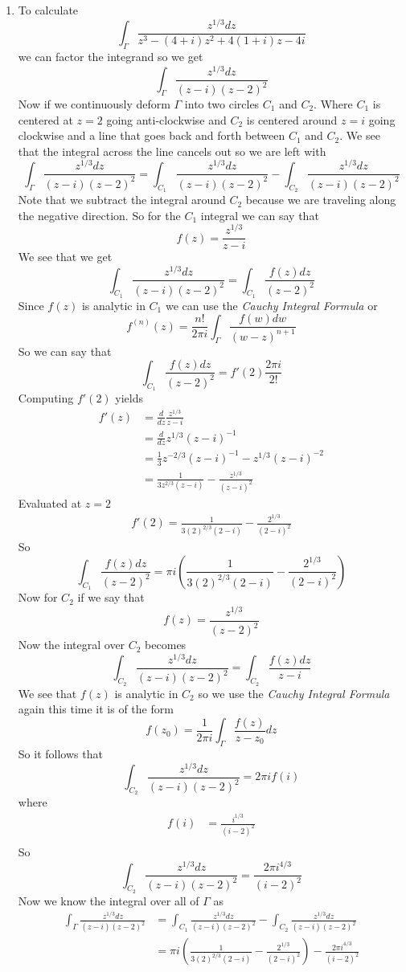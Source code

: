 \documentclass[11pt]{article}
\begin{document}
\begin{enumerate}
\begin{enumerate}
\item  
To calculate 
$$\int_{\Gamma}\frac{z^{1/3}dz}{z^3-(4+i)z^2+4(1+i)z-4i}$$
we can factor the integrand so we get
$$\int_{\Gamma}\frac{z^{1/3}dz}{(z-i)(z-2)^2}$$
Now if we continuously deform $\Gamma$ into two circles $C_1$ and $C_2$. Where $C_1$ is centered at $z=2$ going anti-clockwise and $C_2$ is centered around $z=i$ going clockwise and a line that goes back and forth between $C_1$ and $C_2$. We see that the integral across the line cancels out so we are left with
$$\int_{\Gamma}\frac{z^{1/3}dz}{(z-i)(z-2)^2} = \int_{C_1}\frac{z^{1/3}dz}{(z-i)(z-2)^2} - \int_{C_2}\frac{z^{1/3}dz}{(z-i)(z-2)^2}$$
Note that we subtract the integral around $C_2$ because we are traveling along the negative direction. So for the $C_1$ integral we can say that 
$$f(z) = \frac{z^{1/3}}{z-i}$$
We see that we get
$$\int_{C_1}\frac{z^{1/3}dz}{(z-i)(z-2)^2} = \int_{C_1}\frac{f(z)dz}{(z-2)^2}$$ 
Since $f(z)$ is analytic in $C_1$ we can use the \emph{Cauchy Integral Formula} or
$$f^{(n)}(z) = \frac{n!}{2\pi i}\int_{\Gamma}\frac{f(w)dw}{(w-z)^{n+1}}$$
So we can say that
$$\int_{C_1}\frac{f(z)dz}{(z-2)^2} = f'(2)\frac{2\pi i}{2!}$$
Computing $f'(2)$ yields
\begin{align*}
f'(z) &= \frac{d}{dz}\frac{z^{1/3}}{z-i}\\
&= \frac{d}{dz}z^{1/3}(z-i)^{-1}\\
&= \frac{1}{3}z^{-2/3}(z-i)^{-1} - z^{1/3}(z-i)^{-2}\\
&= \frac{1}{3z^{2/3}(z-i)} - \frac{z^{1/3}}{(z-i)^{2}}
\end{align*}
Evaluated at $z=2$ 
\begin{align*}
f'(2) = \frac{1}{3(2)^{2/3}(2-i)} - \frac{2^{1/3}}{(2-i)^{2}}
\end{align*}
So 
$$\int_{C_1}\frac{f(z)dz}{(z-2)^2} = \pi i\left(\frac{1}{3(2)^{2/3}(2-i)} - \frac{2^{1/3}}{(2-i)^{2}}\right)$$
Now for $C_2$ if we say that 
$$f(z) = \frac{z^{1/3}}{(z-2)^2}$$
Now the integral over $C_2$ becomes 
$$\int_{C_2}\frac{z^{1/3}dz}{(z-i)(z-2)^2} = \int_{C_2}\frac{f(z)dz}{z-i} $$
We see that $f(z)$ is analytic in $C_2$ so we use the \emph{Cauchy Integral Formula} again this time it is of the form
$$f(z_0) = \frac{1}{2\pi i}\int_{\Gamma}\frac{f(z)}{z-z_0}dz$$
So it follows that
$$\int_{C_2}\frac{z^{1/3}dz}{(z-i)(z-2)^2} = 2\pi if(i)$$
where
\begin{align*}
f(i) &= \frac{i^{1/3}}{(i-2)^2}\\
\end{align*}
So 
$$\int_{C_2}\frac{z^{1/3}dz}{(z-i)(z-2)^2} = \frac{2\pi i^{4/3}}{(i-2)^2}$$
Now we know the integral over all of $\Gamma$ as
\begin{align*}
\int_{\Gamma}\frac{z^{1/3}dz}{(z-i)(z-2)^2} &= \int_{C_1}\frac{z^{1/3}dz}{(z-i)(z-2)^2} - \int_{C_2}\frac{z^{1/3}dz}{(z-i)(z-2)^2}\\
&= \pi i\left(\frac{1}{3(2)^{2/3}(2-i)} - \frac{2^{1/3}}{(2-i)^{2}}\right)- \frac{2\pi i^{4/3}}{(i-2)^2}
\end{align*}


\end{enumerate}
\end{enumerate}
\end{document}
